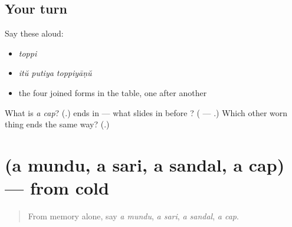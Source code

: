 \subsection*{Your turn}
Say these aloud:

\begin{itemize}
\raggedright
  \item \emph{toppi}
  \item \emph{itŭ putiya toppiyāṇŭ}
  \item the four joined forms in the table, one after another
\end{itemize}

\begin{tcolorbox}[breakable,colback=teal!4,colframe=teal!35!black,title={Before you move on}]
What is \emph{a cap}? (\textbf{}.) \textbf{} ends in \textbf{} — what slides in before \textbf{}? (\textbf{} — \textbf{}.) Which other worn thing ends the same way? (\textbf{}.)
\end{tcolorbox}
\section[(a mundu, a sari, a sandal, a cap)]{(a mundu, a sari, a sandal, a cap) — from cold}

\label{lesson:ML-R100-clothing-recall}



\begin{quote}
From memory alone, say \emph{a mundu}, \emph{a sari}, \emph{a sandal}, \emph{a cap}.
\end{quote}


